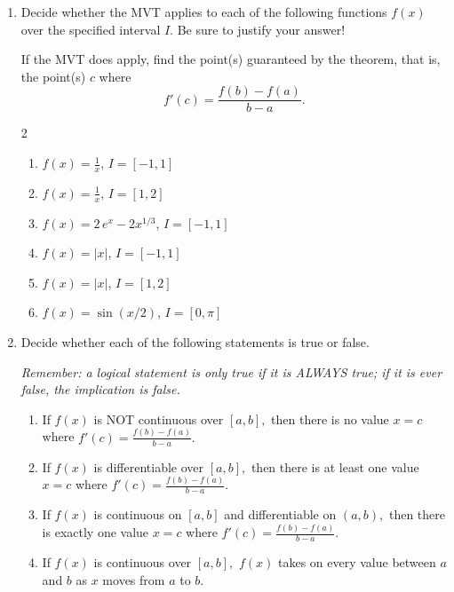 \documentclass{article}
\newcommand{\vsp}{\vspace{1em}}
\newcommand{\<}{\langle}
\renewcommand{\>}{\rangle}
\begin{document}
\begin{enumerate}
\item Decide whether the MVT applies to each of the following functions $f(x)$ over the specified interval $I$. Be sure to justify your answer! 

If the MVT does apply, find the point(s) guaranteed by the theorem, that is, the point(s) $c$ where $$f'(c)=\frac{f(b)-f(a)}{b-a}.$$

\begin{multicols}{2}
\begin{enumerate}
    \item $\displaystyle f(x)=\frac{1}{x}$, $I=[-1,1]$\medskip
    
    \item $\displaystyle  f(x)=\frac{1}{x}$, $I=[1,2]$\medskip

    \item $\displaystyle  f(x)=2\,e^x-2x^{1/3}$, $I=[-1,1]$ \medskip
    
    \item $\displaystyle  f(x)=|x|$, $I=[-1,1]$ \medskip
    
    \item $\displaystyle f(x)=|x|$, $I=[1,2]$\medskip

    \item $\displaystyle  f(x)=\sin\left(x/2\right)$, $I=[0,\pi]$ \medskip
\end{enumerate}
\end{multicols}
\vsp 

\item Decide whether each of the following statements is true or false. 

\emph{Remember: a logical statement is only true if it is ALWAYS true; if it is ever false, the implication is false.}

\begin{enumerate}
    \item If $f(x)$ is NOT continuous over $[a,b],$ then there is no value $x=c$ where $\displaystyle f'(c)=\frac{f(b)-f(a)}{b-a}.$ \vsp

    \item If $f(x)$ is differentiable over $[a,b],$ then there is at least one value $x=c$ where $\displaystyle f'(c)=\frac{f(b)-f(a)}{b-a}.$ \vsp
    
    \item If $f(x)$ is continuous on $[a,b]$ and differentiable on $(a,b),$ then there is exactly one  value $x=c$ where $\displaystyle f'(c)=\frac{f(b)-f(a)}{b-a}.$ \vsp
    
    \item If $f(x)$ is continuous over $[a,b],$ $f(x)$ takes on every value between $a$ and $b$ as $x$ moves from $a$ to $b$. \vsp
    

\end{enumerate}
\end{enumerate}
\end{document}
